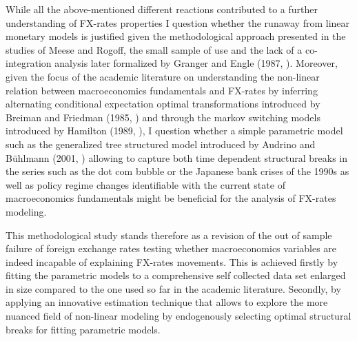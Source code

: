 While all the above-mentioned different reactions contributed to a
further understanding of FX-rates properties I question whether the
runaway from linear monetary models is justified given the
methodological approach presented in the studies of Meese and Rogoff,
the small sample of use and the lack of a co-integration analysis
later formalized by Granger and Engle (1987,
\cite{EngleGranger}). Moreover, given the focus of the academic
literature on understanding the non-linear relation between
macroeconomics fundamentals and FX-rates by inferring alternating
conditional expectation optimal transformations introduced by Breiman
and Friedman (1985, \cite{BreimanFriedman}) and through the markov
switching models introduced by Hamilton (1989, \cite{Hamilton}), I
question whether a simple parametric model such as the generalized
tree structured model introduced by Audrino and B{\"u}hlmann (2001,
\cite{AudrinoBuhlmann}) allowing to capture both time dependent
structural breaks in the series such as the dot com bubble or the
Japanese bank crises of the 1990s as well as policy regime changes
identifiable with the current state of macroeconomics fundamentals
might be beneficial for the analysis of FX-rates modeling.


% 
%
This methodological study stands therefore as a revision of the out of
sample failure of foreign exchange rates testing whether
macroeconomics variables are indeed incapable of explaining FX-rates
movements. This is achieved firstly by fitting the parametric models
to a comprehensive self collected data set enlarged in size compared
to the one used so far in the academic literature. Secondly, by
applying an innovative estimation technique that allows to explore the
more nuanced field of non-linear modeling by endogenously selecting
optimal structural breaks for fitting parametric models.


